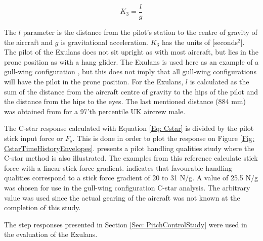 \documentclass{report}
\begin{document}
\begin{equation}\label{Eq: CstarK3}
	K_3 = \frac{l}{g}
\end{equation}

The $l$ parameter is the distance from the pilot's station to the centre of gravity of the aircraft and $g$ is gravitational acceleration.  $K_3$ has the units of [seconds$^2$].  The pilot of the Exulans does not sit upright as with most aircraft, but lies in the prone position as with a hang glider.  The Exulans is used here as an example of a gull-wing configuration , but this does not imply that all gull-wing configurations will have the pilot in the prone position.  For the Exulans, $l$ is calculated as the sum of the distance from the aircraft centre of gravity to the hips of the pilot and the distance from the hips to the eyes.  The last mentioned distance (884 mm) was obtained from \cite{DEFSTANhuman} for a 97'th percentile UK aircrew male.  

The C-star response calculated with Equation \ref{Eq: Cstar} is divided by the pilot stick input force or $F_s$.  This is done in order to plot the response on Figure \ref{Fig: CstarTimeHistoryEnvelopes}.  \cite{NealSmith} presents a pilot handling qualities study where the C-star method is also illustrated.  The examples from this reference calculate stick force with a linear stick force gradient.   indicates that favourable handling qualities correspond to a stick force gradient of 20 to 31 N/g.  A value of 25.5 N/g was chosen for use in the gull-wing configuration C-star analysis.  The arbitrary value was used since the actual gearing of the aircraft was not known at the completion of this study.   

The step responses presented in Section \ref{Sec: PitchControlStudy} were used in the evaluation of the Exulans. 

\end{document}

